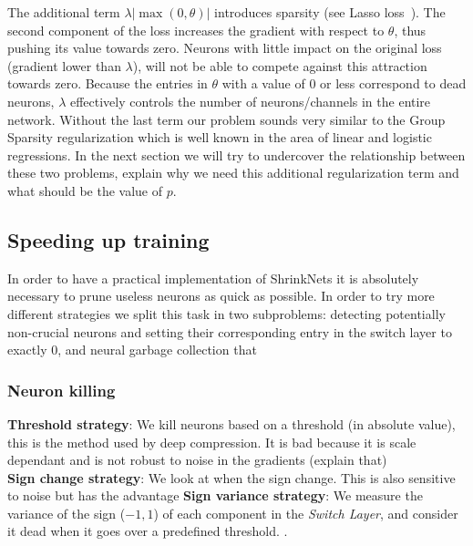 The additional term $\lambda|\max(0, \theta)|$ introduces sparsity (see Lasso
loss~\cite{Tibshirani1996}). 
 The second component of the loss increases the gradient with respect to $\theta$, thus pushing its value towards zero. Neurons with little impact
on the original loss (gradient lower than $\lambda$), will not be able to
compete against this attraction towards zero. Because the entries in $\theta$
with a value of $0$ or less correspond to dead neurons, $\lambda$ effectively
controls the number of neurons/channels in the entire network. Without the last
term our problem sounds very similar to the Group Sparsity regularization which
is well known in the area of linear and logistic regressions. In the next
section we will try to undercover the relationship between these two problems,
explain why we need this additional regularization term and what should be the
value of $p$.



\subsection{Speeding up training}

In order to have a practical implementation of ShrinkNets it is absolutely
necessary to prune useless neurons as quick as possible. In order to try more
different strategies we split this task in two subproblems: detecting
potentially non-crucial neurons and setting their corresponding entry in the
switch layer to exactly 0, and neural garbage collection that 

\subsubsection{Neuron killing}
\textbf{Threshold strategy}:  We kill neurons based on a threshold (in absolute
value), this is the method used by deep compression. It is bad because it is
scale dependant and is not robust to noise in the gradients (explain that)
\\ \textbf{Sign change strategy}:  We look at when the sign change. This is also
sensitive to noise but has the advantage
\textbf{Sign variance strategy}: We measure the variance of the sign ($-1, 1$) of each component in the \textit{Switch Layer}, and consider it dead when it goes over a predefined threshold. . 

